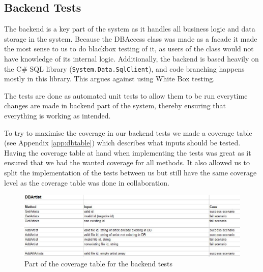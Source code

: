 \subsection{Backend Tests}
The backend is a key part of the system as it handles all business logic and data storage in the system. Because 
the DBAccess class was made as a facade it made the most sense to us to do blackbox testing of it, as users of
the class would not have knowledge of its internal logic. Additionally, the backend is based heavily on the C\#
SQL library (\verb+System.Data.SqlClient+), and code branching happens mostly in this library. This argues against
using White Box testing.

The tests are done as automated unit tests to allow them
to be run everytime changes are made in backend part of the system, thereby ensuring that everything is working as
intended.

To try to maximise the coverage in our backend tests we made a coverage table
(see Appendix \ref{app:dbtable}) which describes what inputs should be tested.
Having the coverage table at hand when implementing the tests was great as it
ensured that we had the wanted coverage for all methods. It also allowed us to
split the implementation of the tests between us but still have the same
coverage level as the coverage table was done in collaboration.

\begin{figure}[hbt]
	\centering
	\includegraphics[scale=0.52]{./testing/coverage.jpg}
	\caption{Part of the coverage table for the backend tests}
	\label{fig:covtabs}
\end{figure}
